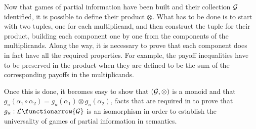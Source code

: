 Now that games of partial information have been built and their collection $\cal G$ identified, it is possible to define their product $\otimes$. What has to be done is to start with two tuples, one for each multiplicand, and then construct the tuple for their product, building each component one by one from the components of the multiplicands. Along the way, it is necessary to prove that each component does in fact have all the required properties. For example, the payoff inequalities have to be preserved in the product when they are defined to be the sum of the corresponding payoffs in the multiplicands. 



Once this is done, it becomes easy to show that $({\cal G}, \otimes)$ is a monoid and that $g_u(\alpha_1 \circ \alpha_2) = g_u(\alpha_1) \otimes g_u(\alpha_2)$, facts that are required in  to prove that $g_u: {\cal L} \functionarrow {\cal G}$ is an isomorphism in order to establish the universality of games of partial information in semantics.


%



